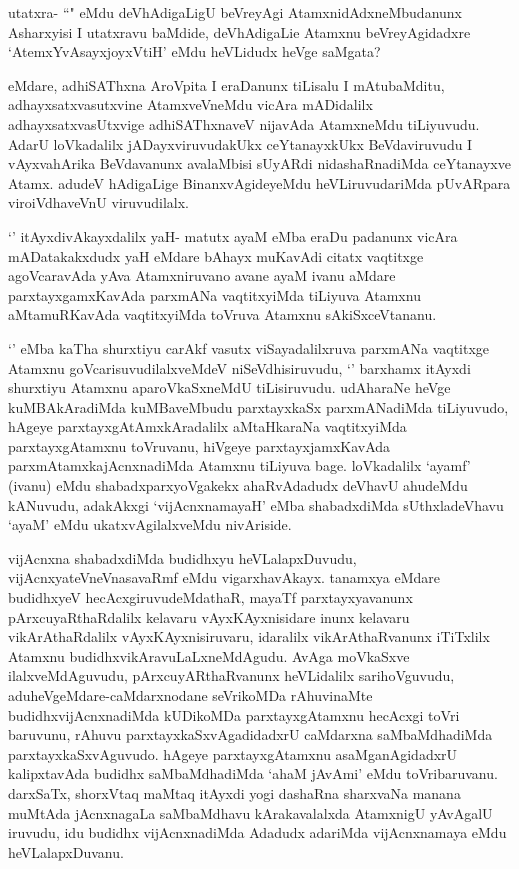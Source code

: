 \begin{artha}
utatxra- ``\stext " eMdu deVhAdigaLigU beVreyAgi AtamxnidAdxneMbudanunx Asharxyisi I utatxravu baMdide, deVhAdigaLie Atamxnu beVreyAgidadxre `AtemxYvAsayxjoyxVtiH' eMdu heVLidudx heVge saMgata?
\end{artha}

\begin{artha}%
eMdare, adhiSAThxna AroVpita I eraDanunx tiLisalu I mAtubaMditu, adhayxsatxvasutxvine AtamxveVneMdu vicAra mADidalilx adhayxsatxvasUtxvige adhiSAThxnaveV nijavAda AtamxneMdu tiLiyuvudu. AdarU loVkadalilx jADayxviruvudakUkx ceYtanayxkUkx BeVdaviruvudu I vAyxvahArika BeVdavanunx avalaMbisi sUyARdi nidashaRnadiMda ceYtanayxve Atamx. adudeV hAdigaLige BinanxvAgideyeMdu heVLiruvudariMda pUvARpara viroiVdhaveVnU viruvudilalx. 
\end{artha}

\begin{artha}
`\stext ' itAyxdivAkayxdalilx yaH- matutx ayaM eMba eraDu padanunx vicAra mADatakakxdudx yaH eMdare bAhayx muKavAdi citatx vaqtitxge agoVcaravAda yAva Atamxniruvano avane ayaM ivanu aMdare parxtayxgamxKavAda parxmANa vaqtitxyiMda tiLiyuva Atamxnu aMtamuRKavAda vaqtitxyiMda toVruva Atamxnu sAkiSxceVtananu. 
\end{artha}

\begin{artha}
`\stext  ' eMba kaTha shurxtiyu carAkf vasutx viSayadalilxruva parxmANa vaqtitxge Atamxnu goVcarisuvudilalxveMdeV niSeVdhisiruvudu, `\stext ' barxhamx itAyxdi shurxtiyu Atamxnu aparoVkaSxneMdU tiLisiruvudu. udAharaNe heVge kuMBAkAradiMda kuMBaveMbudu parxtayxkaSx parxmANadiMda tiLiyuvudo, hAgeye parxtayxgAtAmxkAradalilx aMtaHkaraNa vaqtitxyiMda parxtayxgAtamxnu toVruvanu, hiVgeye parxtayxjamxKavAda parxmAtamxkajAcnxnadiMda Atamxnu tiLiyuva bage. loVkadalilx `ayamf' (ivanu) eMdu shabadxparxyoVgakekx ahaRvAdadudx deVhavU ahudeMdu kANuvudu, adakAkxgi `vijAcnxnamayaH' eMba shabadxdiMda sUthxladeVhavu `ayaM' eMdu ukatxvAgilalxveMdu nivAriside.
\end{artha}


\begin{artha}
vijAcnxna shabadxdiMda budidhxyu heVLalapxDuvudu, vijAcnxyateV\s neVnasavaRmf eMdu vigarxhavAkayx. tanamxya eMdare budidhxyeV hecAcxgiruvudeMdathaR, mayaTf parxtayxyavanunx pArxcuyaRthaRdalilx kelavaru vAyxKAyxnisidare inunx kelavaru vikArAthaRdalilx vAyxKAyxnisiruvaru, idaralilx vikArAthaRvanunx iTiTxlilx Atamxnu budidhxvikAravuLaLxneMdAgudu. AvAga moVkaSxve ilalxveMdAguvudu, pArxcuyARthaRvanunx heVLidalilx sarihoVguvudu, aduheVgeMdare-caMdarxnodane seVrikoMDa rAhuvinaMte budidhxvijAcnxnadiMda kUDikoMDa parxtayxgAtamxnu hecAcxgi toVri baruvunu, rAhuvu parxtayxkaSxvAgadidadxrU caMdarxna saMbaMdhadiMda parxtayxkaSxvAguvudo. hAgeye parxtayxgAtamxnu asaMganAgidadxrU kalipxtavAda budidhx saMbaMdhadiMda `ahaM jAvAmi' eMdu toVribaruvanu. darxSaTx, shorxVtaq maMtaq itAyxdi yogi dashaRna sharxvaNa manana muMtAda jAcnxnagaLa saMbaMdhavu kArakavalalxda AtamxnigU yAvAgalU iruvudu, idu budidhx vijAcnxnadiMda Adadudx adariMda vijAcnxnamaya eMdu heVLalapxDuvanu. 
\end{artha}

